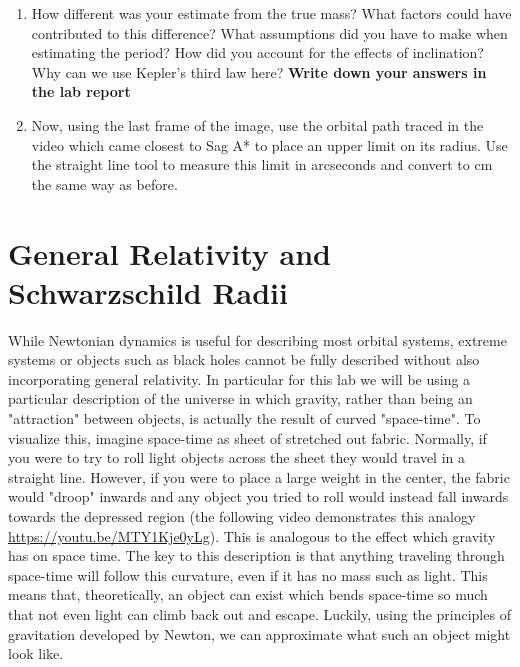 \begin{enumerate}
	\item How different was your estimate from the true mass? What factors could have contributed to this difference? What assumptions did you have to make when estimating the period? How did you account for the effects of inclination? Why can we use Kepler's third law here? \textbf{Write down your answers in the lab report}
	
	\item Now, using the last frame of the image, use the orbital path traced in the video which came closest to Sag A* to place an upper limit on its radius. Use the straight line tool to measure this limit in arcseconds and convert to cm the same way as before. 
	
	
\end{enumerate}
\section{General Relativity and Schwarzschild Radii}
While Newtonian dynamics is useful for describing most orbital systems, extreme systems or objects such as black holes cannot be fully described without also incorporating general relativity. In particular for this lab we will be using a particular description of the universe in which gravity, rather than being an "attraction" between objects, is actually the result of curved "space-time". To visualize this, imagine space-time as sheet of stretched out fabric. Normally, if you were to try to roll light objects across the sheet they would travel in a straight line. However, if you were to place a large weight in the center, the fabric would "droop" inwards and any object you tried to roll would instead fall inwards towards the depressed region (the following video demonstrates this analogy \url{https://youtu.be/MTY1Kje0yLg}). This is analogous to the effect which gravity has on space time. The key to this description is that anything traveling through space-time will follow this curvature, even if it has no mass such as light. This means that, theoretically, an object can exist which bends space-time so much that not even light can climb back out and escape. Luckily, using the principles of gravitation developed by Newton, we can approximate what such an object might look like. 

